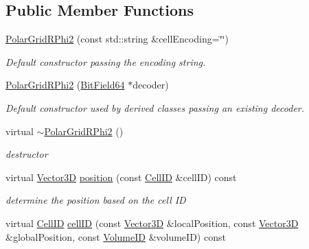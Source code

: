 \subsection*{Public Member Functions}
\begin{DoxyCompactItemize}
\item 
\hyperlink{class_d_d4hep_1_1_d_d_segmentation_1_1_polar_grid_r_phi2_a88552803b42baa290fc38268bc06f099}{PolarGridRPhi2} (const std::string \&cellEncoding=\char`\"{}\char`\"{})
\begin{DoxyCompactList}\small\item\em Default constructor passing the encoding string. \item\end{DoxyCompactList}\item 
\hyperlink{class_d_d4hep_1_1_d_d_segmentation_1_1_polar_grid_r_phi2_ad79eed46ad54d3caf96ef51b8fd29ea7}{PolarGridRPhi2} (\hyperlink{class_d_d4hep_1_1_d_d_segmentation_1_1_bit_field64}{BitField64} $\ast$decoder)
\begin{DoxyCompactList}\small\item\em Default constructor used by derived classes passing an existing decoder. \item\end{DoxyCompactList}\item 
virtual \hyperlink{class_d_d4hep_1_1_d_d_segmentation_1_1_polar_grid_r_phi2_a63dc7071aea7a6fbcb5a01b35bdad59e}{$\sim$PolarGridRPhi2} ()
\begin{DoxyCompactList}\small\item\em destructor \item\end{DoxyCompactList}\item 
virtual \hyperlink{struct_d_d4hep_1_1_d_d_segmentation_1_1_vector3_d}{Vector3D} \hyperlink{class_d_d4hep_1_1_d_d_segmentation_1_1_polar_grid_r_phi2_a5a61e856d814397d2be8046585266863}{position} (const \hyperlink{namespace_d_d4hep_1_1_d_d_segmentation_ac7af071d85cb48820914434a07e21ba1}{CellID} \&cellID) const 
\begin{DoxyCompactList}\small\item\em determine the position based on the cell ID \item\end{DoxyCompactList}\item 
virtual \hyperlink{namespace_d_d4hep_1_1_d_d_segmentation_ac7af071d85cb48820914434a07e21ba1}{CellID} \hyperlink{class_d_d4hep_1_1_d_d_segmentation_1_1_polar_grid_r_phi2_ae1cd15b95add489ababb51f9103de6b4}{cellID} (const \hyperlink{struct_d_d4hep_1_1_d_d_segmentation_1_1_vector3_d}{Vector3D} \&localPosition, const \hyperlink{struct_d_d4hep_1_1_d_d_segmentation_1_1_vector3_d}{Vector3D} \&globalPosition, const \hyperlink{namespace_d_d4hep_1_1_d_d_segmentation_a61a6833a18d1800bdef176595f83e3ba}{VolumeID} \&volumeID) const 

\end{DoxyCompactItemize}

